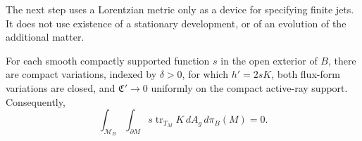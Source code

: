 The next step uses a Lorentzian metric only as a device for specifying
finite jets.  It does not use existence of a stationary development, or
of an evolution of the additional matter.

\begin{lemma}\label{va:gaussian-jets}
For each smooth compactly supported function \(s\) in the open exterior
of \(B\), there are compact variations, indexed by \(\delta>0\), for
which \(h'=2sK\), both flux-form variations are closed, and
\(\mathfrak C'\to0\) uniformly on the compact active-ray support.
Consequently,
\begin{equation}\label{va:averaged-trace}
 \int_{\mathcal M_B}\int_{\partial M}
 s\operatorname{tr}_{T_M}K\,dA_g\,d\pi_B(M)=0.
\end{equation}
\end{lemma}
